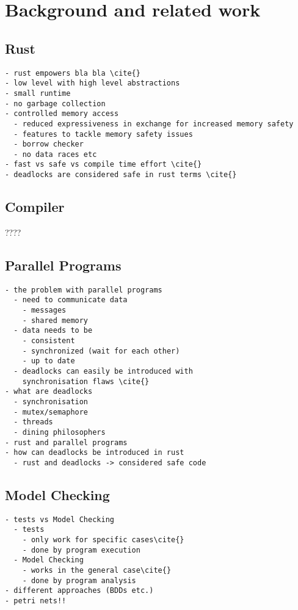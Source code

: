 \chapter{Background and related work}
\section{Rust}
\label{rel_rust}
\begin{verbatim}
- rust empowers bla bla \cite{}
- low level with high level abstractions
- small runtime
- no garbage collection
- controlled memory access
  - reduced expressiveness in exchange for increased memory safety
  - features to tackle memory safety issues
  - borrow checker
  - no data races etc
- fast vs safe vs compile time effort \cite{}
- deadlocks are considered safe in rust terms \cite{}
\end{verbatim}

\section{Compiler}%
????


\section{Parallel Programs}
\label{rel_para}
\begin{verbatim}
- the problem with parallel programs
  - need to communicate data
    - messages
    - shared memory
  - data needs to be 
    - consistent 
    - synchronized (wait for each other)
    - up to date
  - deadlocks can easily be introduced with 
    synchronisation flaws \cite{}
- what are deadlocks
  - synchronisation
  - mutex/semaphore
  - threads
  - dining philosophers
- rust and parallel programs
- how can deadlocks be introduced in rust
  - rust and deadlocks -> considered safe code
\end{verbatim}

\section{Model Checking}
\label{rel_mc}
\begin{verbatim}
- tests vs Model Checking
  - tests 
    - only work for specific cases\cite{}
    - done by program execution
  - Model Checking 
    - works in the general case\cite{}
    - done by program analysis
- different approaches (BDDs etc.)
- petri nets!!
\end{verbatim}

